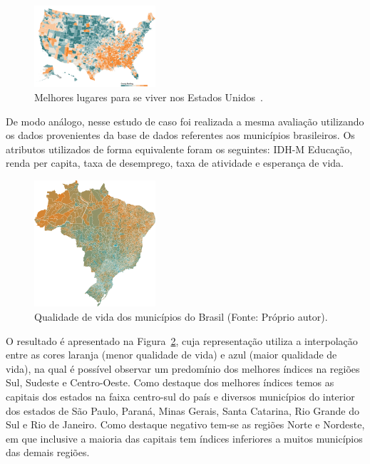 \documentclass[conference]{IEEEtran}
\begin{document}
\begin{figure}[!ht]
\centering
\includegraphics[width=0.40\textwidth]{usa.png}
\caption{Melhores lugares para se viver nos Estados Unidos~\cite{nytimes}.}
\label{img:lugares-viver-usa}
\end{figure}

De modo análogo, nesse estudo de caso foi realizada a mesma avaliação utilizando os dados provenientes da base de dados referentes aos municípios brasileiros. Os atributos utilizados de forma equivalente foram os seguintes: IDH-M Educação, renda per capita, taxa de desemprego, taxa de atividade e esperança de vida. 

\begin{figure}[!ht]
\centering
\includegraphics[width=0.40\textwidth]{qualidade-de-vida.png}
\caption{Qualidade de vida dos municípios do Brasil (Fonte: Próprio autor).}
\label{img:qualidade-de-vida-brasil}
\end{figure}

O resultado é apresentado na Figura~\ref{img:qualidade-de-vida-brasil}, cuja representação utiliza a interpolação entre as cores laranja (menor qualidade de vida) e azul (maior qualidade de vida), na qual é possível observar um predomínio dos melhores índices na regiões Sul, Sudeste e Centro-Oeste. Como destaque dos melhores índices temos as capitais dos estados na faixa centro-sul do país e diversos municípios do interior dos estados de São Paulo, Paraná, Minas Gerais, Santa Catarina, Rio Grande do Sul e Rio de Janeiro. Como destaque negativo tem-se as regiões Norte e Nordeste, em que inclusive a maioria das capitais tem índices inferiores a muitos municípios das demais regiões.
\end{document}
